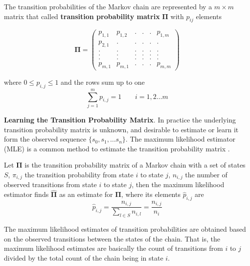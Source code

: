 The transition probabilities of the Markov chain are represented by a $m \times m$ matrix that called \textbf{transition probability matrix} $\boldsymbol{\Pi}$ with $p_{ij}$ elements


\begin{equation}
\label{eq:matrix_example}
\boldsymbol{\Pi} = 
\begin{pmatrix} 
p_{1,1}	   &p_{1,2}  &. 		&. 		& . &  	p_{1,m} \\
p_{2,1}		   &.  & .		& .	    & .	& . \\
. 		   &.  & .		& .	    & .	& . \\
.		   &.  & .		& .		& .	& . \\
.		   &.  & .		& .		& .	& .\\
p_{m,1}	   & p_{m,1}	&.		& .	& .	&p_{m,m}
\end{pmatrix}
\end{equation}

where $0 \leq p_{i,j}\leq 1 $ and the rows sum up to one 
\begin{equation}
\sum_{j=1}^{m} p_{i,j}= 1\ \ \ \ \ \ \ \ \ i=1,2 \ldots m
\end{equation}

\textbf{Learning the Transition Probability Matrix}. In practice the underlying  transition probability matrix is unknown, and desirable to estimate or learn it form the observed sequence $\{s_0, s_1, \ldots s_n\}$. The maximum likelihood estimator (MLE) is a common method to estimate the transition probability matrix \cite{anderson1957statistical}.


\begin{definition}
	Let $\boldsymbol{\Pi}$ is the transition probability matrix of a Markov chain with a set of states $S$, 
	$\pi_{i,j}$ the transition probability from state $i$ to state $j$,
	$n_{i,j}$ the number of observed transitions from state $i$ to state $j$,
	then the maximum likelihood estimator finds $\boldsymbol{\hat{\Pi}}$ as an estimate for $\boldsymbol{\Pi}$, where its elements $\hat{p}_{i,j}$ are
	\begin{equation}
	\label{eq:pi_estim}
	\hat{p}_{i,j}=\frac{n_{i,j}}{\sum_{l \in S} n_{i,l}}=\frac{n_{i,j}}{n_{i}}
	\end{equation}
	
\end{definition} 


	The maximum likelihood estimates of transition probabilities are obtained based on the observed transitions between the states of the chain. That is, the maximum likelihood estimates are basically the count of transitions from $i$ to $j$ divided by the total count of the chain being in state $i$.  
	
